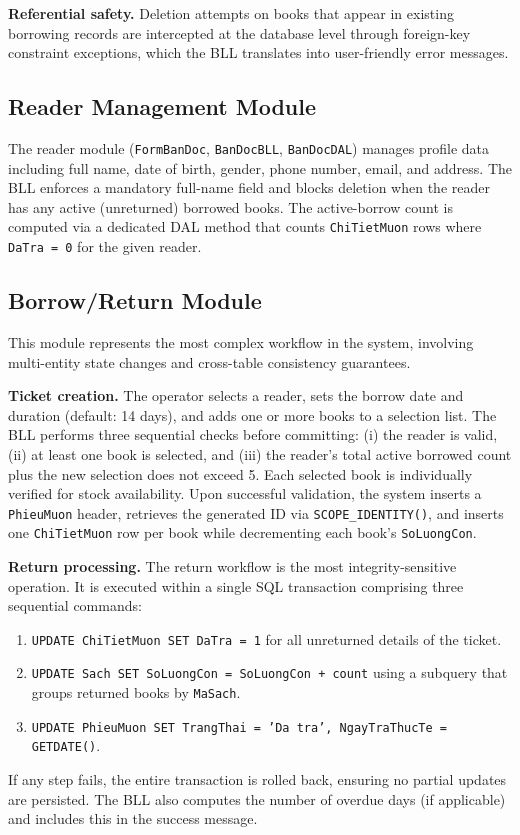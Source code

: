 \documentclass[12pt,a4paper]{article}
\begin{document}
\textbf{Referential safety.} Deletion attempts on books that appear in existing borrowing records are intercepted at the database level through foreign-key constraint exceptions, which the BLL translates into user-friendly error messages.

\subsection{Reader Management Module}
The reader module (\texttt{FormBanDoc}, \texttt{BanDocBLL}, \texttt{BanDocDAL}) manages profile data including full name, date of birth, gender, phone number, email, and address. The BLL enforces a mandatory full-name field and blocks deletion when the reader has any active (unreturned) borrowed books. The active-borrow count is computed via a dedicated DAL method that counts \texttt{ChiTietMuon} rows where \texttt{DaTra = 0} for the given reader.

\subsection{Borrow/Return Module}
This module represents the most complex workflow in the system, involving multi-entity state changes and cross-table consistency guarantees.

\textbf{Ticket creation.} The operator selects a reader, sets the borrow date and duration (default: 14 days), and adds one or more books to a selection list. The BLL performs three sequential checks before committing: (i) the reader is valid, (ii) at least one book is selected, and (iii) the reader's total active borrowed count plus the new selection does not exceed 5. Each selected book is individually verified for stock availability. Upon successful validation, the system inserts a \texttt{PhieuMuon} header, retrieves the generated ID via \texttt{SCOPE\_IDENTITY()}, and inserts one \texttt{ChiTietMuon} row per book while decrementing each book's \texttt{SoLuongCon}.

\textbf{Return processing.} The return workflow is the most integrity-sensitive operation. It is executed within a single SQL transaction comprising three sequential commands:
\begin{enumerate}[leftmargin=1.5cm]
    \item \texttt{UPDATE ChiTietMuon SET DaTra = 1} for all unreturned details of the ticket.
    \item \texttt{UPDATE Sach SET SoLuongCon = SoLuongCon + count} using a subquery that groups returned books by \texttt{MaSach}.
    \item \texttt{UPDATE PhieuMuon SET TrangThai = 'Da tra', NgayTraThucTe = GETDATE()}.
\end{enumerate}
If any step fails, the entire transaction is rolled back, ensuring no partial updates are persisted. The BLL also computes the number of overdue days (if applicable) and includes this in the success message.
\end{document}
